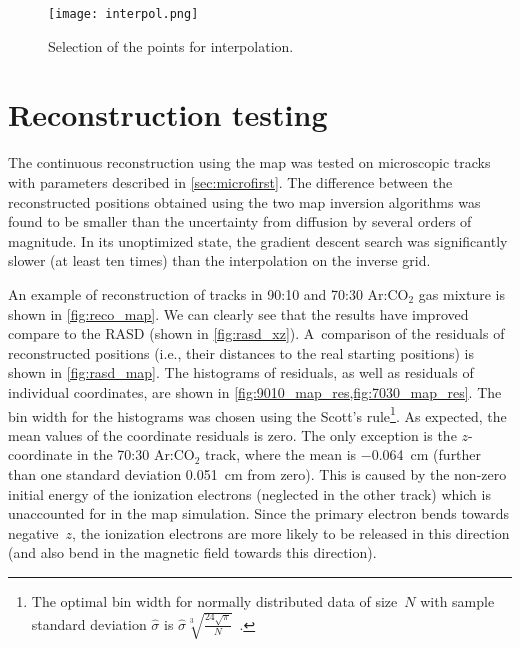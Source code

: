 			
			\begin{figure}[H]
				\centering
				\texttt{[image: interpol.png]}
				\caption{Selection of the points for interpolation.}
				\label{fig:interpol}
			\end{figure}
			
		\section{Reconstruction testing}
			The continuous reconstruction using the map was tested on microscopic tracks with parameters described in \cref{sec:microfirst}. The difference between the reconstructed positions obtained using the two map inversion algorithms was found to be smaller than the uncertainty from diffusion by several orders of magnitude. In its unoptimized state, the gradient descent search was significantly slower (at least ten times) than the interpolation on the inverse grid.
			
			An example of reconstruction of tracks in 90:10 and 70:30 Ar:CO$_2$ gas mixture is shown in \cref{fig:reco_map}. We can clearly see that the results have improved compare to the \acf{RASD} (shown in \cref{fig:rasd_xz}). A~comparison of the residuals of reconstructed positions (i.e., their distances to the real starting positions) is shown in \cref{fig:rasd_map}. The histograms of residuals, as well as residuals of individual coordinates, are shown in \cref{fig:9010_map_res,fig:7030_map_res}. The bin width for the histograms was chosen using the Scott's rule\footnote{The optimal bin width for normally distributed data of size~$N$ with sample standard deviation $\hat{\sigma}$ is $\hat{\sigma}\sqrt[3]{\frac{24\sqrt{\pi}}{N}}$~\cite{scott}.}. As expected, the mean values of the coordinate residuals is zero. The only exception is the $z$\nobreakdash-coordinate in the 70:30 Ar:CO$_2$ track, where the mean is \qty{-0.064}{\cm} (further than one standard deviation \qty{0.051}{\cm} from zero). This is caused by the non-zero initial energy of the ionization electrons (neglected in the other track) which is unaccounted for in the map simulation. Since the primary electron bends towards negative~$z$, the ionization electrons are more likely to be released in this direction (and also bend in the magnetic field towards this direction).
			
